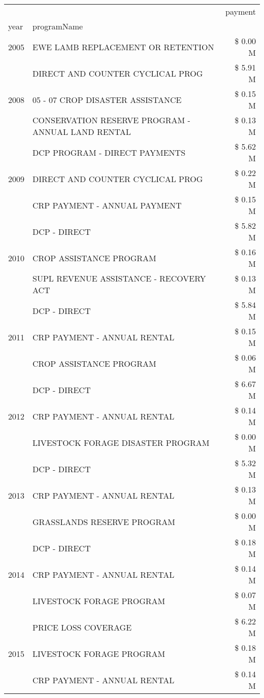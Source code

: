 \begin{tabular}{llr}
\toprule
 &  & payment \\
year & programName &  \\
\midrule
2005 & EWE LAMB REPLACEMENT OR RETENTION & \$ 0.00 M \\
\cline{1-3}
\multirow[t]{3}{*}{2008} & DIRECT AND COUNTER CYCLICAL PROG & \$ 5.91 M \\
 & 05 - 07 CROP DISASTER ASSISTANCE & \$ 0.15 M \\
 & CONSERVATION RESERVE PROGRAM - ANNUAL LAND RENTAL & \$ 0.13 M \\
\cline{1-3}
\multirow[t]{3}{*}{2009} & DCP PROGRAM - DIRECT PAYMENTS & \$ 5.62 M \\
 & DIRECT AND COUNTER CYCLICAL PROG & \$ 0.22 M \\
 & CRP PAYMENT - ANNUAL PAYMENT & \$ 0.15 M \\
\cline{1-3}
\multirow[t]{3}{*}{2010} & DCP - DIRECT & \$ 5.82 M \\
 & CROP ASSISTANCE PROGRAM & \$ 0.16 M \\
 & SUPL REVENUE ASSISTANCE - RECOVERY ACT & \$ 0.13 M \\
\cline{1-3}
\multirow[t]{3}{*}{2011} & DCP - DIRECT & \$ 5.84 M \\
 & CRP PAYMENT - ANNUAL RENTAL & \$ 0.15 M \\
 & CROP ASSISTANCE PROGRAM & \$ 0.06 M \\
\cline{1-3}
\multirow[t]{3}{*}{2012} & DCP - DIRECT & \$ 6.67 M \\
 & CRP PAYMENT - ANNUAL RENTAL & \$ 0.14 M \\
 & LIVESTOCK FORAGE DISASTER PROGRAM & \$ 0.00 M \\
\cline{1-3}
\multirow[t]{3}{*}{2013} & DCP - DIRECT & \$ 5.32 M \\
 & CRP PAYMENT - ANNUAL RENTAL & \$ 0.13 M \\
 & GRASSLANDS RESERVE PROGRAM & \$ 0.00 M \\
\cline{1-3}
\multirow[t]{3}{*}{2014} & DCP - DIRECT & \$ 0.18 M \\
 & CRP PAYMENT - ANNUAL RENTAL & \$ 0.14 M \\
 & LIVESTOCK FORAGE PROGRAM & \$ 0.07 M \\
\cline{1-3}
\multirow[t]{3}{*}{2015} & PRICE LOSS COVERAGE & \$ 6.22 M \\
 & LIVESTOCK FORAGE PROGRAM & \$ 0.18 M \\
 & CRP PAYMENT - ANNUAL RENTAL & \$ 0.14 M \\

\end{tabular}
